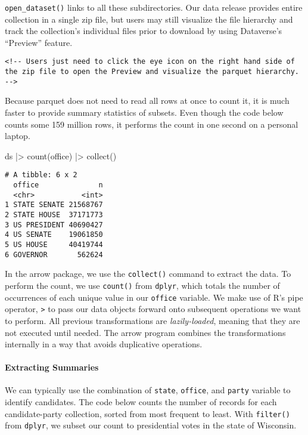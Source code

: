 \documentclass[fleqn,10pt]{wlscirep}
\let\oldparagraph\paragraph
\renewcommand{\paragraph}[1]{\oldparagraph{#1}\mbox{}}
\newenvironment{Shaded}{\begin{snugshade}}{\end{snugshade}}
\newcommand{\FunctionTok}[1]{\textcolor[rgb]{0.28,0.35,0.67}{#1}}
\newcommand{\NormalTok}[1]{\textcolor[rgb]{0.00,0.23,0.31}{#1}}
\newcommand{\SpecialCharTok}[1]{\textcolor[rgb]{0.37,0.37,0.37}{#1}}
\begin{document}
\texttt{open\_dataset()} links to all these subdirectories. Our data
release provides entire collection in a single zip file, but users may
still visualize the file hierarchy and track the collection's individual
files prior to download by using Dataverse's ``Preview'' feature.

\begin{verbatim}
<!-- Users just need to click the eye icon on the right hand side of the zip file to open the Preview and visualize the parquet hierarchy. -->
\end{verbatim}

Because parquet does not need to read all rows at once to count it, it
is much faster to provide summary statistics of subsets. Even though the
code below counts some 159 million rows, it performs the count in one
second on a personal laptop.

\begin{Shaded}
\begin{Highlighting}[]
\NormalTok{ds }\SpecialCharTok{|\textgreater{}} \FunctionTok{count}\NormalTok{(office) }\SpecialCharTok{|\textgreater{}} \FunctionTok{collect}\NormalTok{()}
\end{Highlighting}
\end{Shaded}

\begin{verbatim}
# A tibble: 6 x 2
  office              n
  <chr>           <int>
1 STATE SENATE 21568767
2 STATE HOUSE  37171773
3 US PRESIDENT 40690427
4 US SENATE    19061850
5 US HOUSE     40419744
6 GOVERNOR       562624
\end{verbatim}

In the arrow package, we use the \texttt{collect()} command to extract
the data. To perform the count, we use \texttt{count()} from
\texttt{dplyr}, which totals the number of occurrences of each unique
value in our \texttt{office} variable. We make use of R's pipe operator,
\texttt{\textbar{}\textgreater{}} to pass our data objects forward onto
subsequent operations we want to perform. All previous transformations
are \emph{lazily-loaded}, meaning that they are not executed until
needed. The arrow program combines the transformations internally in a
way that avoids duplicative operations.

\paragraph{Extracting Summaries}

We can typically use the combination of \texttt{state}, \texttt{office},
and \texttt{party} variable to identify candidates. The code below
counts the number of records for each candidate-party collection, sorted
from most frequent to least. With \texttt{filter()} from \texttt{dplyr},
we subset our count to presidential votes in the state of Wisconsin.
\end{document}
